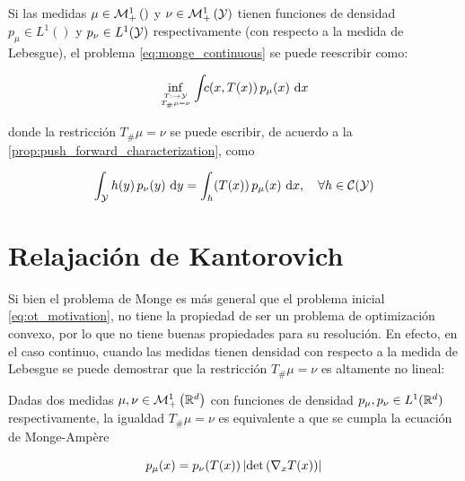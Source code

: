 Si las medidas $\mu\in\mathcal{M}_+^1\left(\right)$ y $\nu\in\mathcal{M}_+^1\left(\mathcal{Y}\right)$ tienen funciones de densidad $p_\mu\in L^1(\xspace)$ y $p_\nu\in L^1(\mathcal{Y})$ respectivamente (con respecto a la medida de Lebesgue), el problema \eqref{eq:monge_continuous} se puede reescribir como:

\begin{equation}
	\inf_{\feasible{T:\xspace\to\yspace}{T_\#\mu=\nu}}
	\int_{\xspace} c(x, T(x))\, p_\mu(x)\d x
\end{equation}

donde la restricción $T_\#\mu=\nu$ se puede escribir, de acuerdo a la \autoref{prop:push_forward_characterization}, como

\begin{equation}
	\int_{\mathcal{Y}} h(y)\, p_\nu(y) \,\operatorname{d}\! y = \int_ h(T(x))\, p_\mu(x) \,\operatorname{d}\! x,
	\quad\forall h\in\mathcal{C}(\mathcal{Y})
\end{equation}

\section{Relajación de Kantorovich}
\label{ot/kantorovich}

Si bien el problema de Monge es más general que el problema inicial \eqref{eq:ot_motivation}, no tiene la propiedad de ser un problema de optimización convexo, por lo que no tiene buenas propiedades para su resolución. En efecto, en el caso continuo, cuando las medidas tienen densidad con respecto a la medida de Lebesgue se puede demostrar que la restricción $T_\#\mu=\nu$ es altamente no lineal:

\begin{prop}
	Dadas dos medidas $\mu,\nu\in\mathcal{M}_+^1\left(\mathbb{R}^d\right)$ con funciones de densidad $p_\mu,p_\nu\in L^1(\mathbb{R}^d)$ respectivamente, la igualdad $T_\#\mu=\nu$ es equivalente a que se cumpla la ecuación de Monge-Ampère

	\begin{equation}
		p_\mu(x) = p_\nu(T(x))\left|\det\left(\nabla_x T(x)\right)\right|
	\end{equation}
\end{prop}

